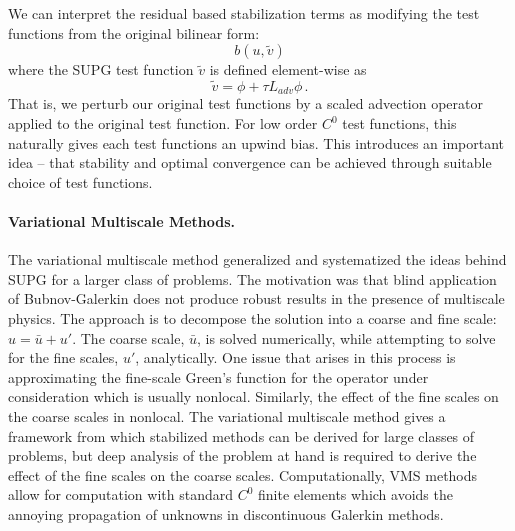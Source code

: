 \documentclass[Dissertation.tex]{subfiles}
\begin{document}
We can interpret the residual based stabilization terms as modifying the test functions from the original bilinear form:
\[
b(u,\tilde v)
\]
where the SUPG test function $\tilde v$ is defined element-wise as
\[
\tilde v=\phi+\tau L_{adv}\phi\,.
\]
That is, we perturb our original test functions by a scaled advection operator applied to the original test function.
For low order $C^0$ test functions, this naturally gives each test functions an upwind bias.
This introduces an important idea -- that stability and optimal convergence can be achieved through suitable choice of test functions.

\paragraph{Variational Multiscale Methods.}
The variational multiscale method generalized and systematized the ideas behind SUPG for a larger class of problems.
The motivation was that blind application of Bubnov-Galerkin does not produce robust results in the presence of multiscale physics\cite{VMS}.
The approach is to decompose the solution into a coarse and fine scale: $u=\bar u+u'$. The coarse scale, $\bar u$, is solved numerically,
while attempting to solve for the fine scales, $u'$, analytically.
One issue that arises in this process is approximating the fine-scale Green's function for the operator under consideration which is usually nonlocal.
Similarly, the effect of the fine scales on the coarse scales in nonlocal.
The variational multiscale method gives a framework from which stabilized methods can be derived for large classes of problems,
but deep analysis of the problem at hand is required to derive the effect of the fine scales on the coarse scales.
Computationally, VMS methods allow for computation with standard $C^0$ finite elements which avoids the annoying propagation of unknowns in
discontinuous Galerkin methods.
\end{document}
